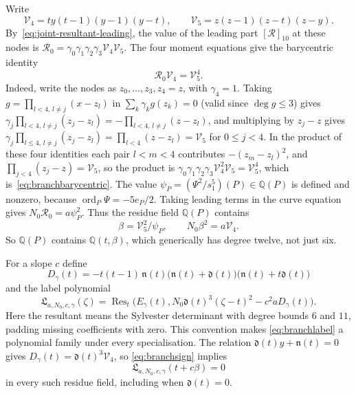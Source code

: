 \documentclass[11pt]{article}
\theoremstyle{definition}
\theoremstyle{remark}
\begin{document}
Write
\[
 \mathcal V_4=t y(t-1)(y-1)(y-t),\qquad \mathcal V_5=z(z-1)(z-t)(z-y).
\]
By~\eqref{eq:joint-resultant-leading}, the value of the leading part
$[\mathcal R]_{10}$ at these nodes is
$\mathcal R_0=\gamma_0\gamma_1\gamma_2\gamma_3\mathcal V_4\mathcal V_5$.
The four moment equations give the barycentric identity
\begin{equation}\label{eq:branchbarycentric}
 \mathcal R_0\mathcal V_4=\mathcal V_5^4.
\end{equation}
Indeed, write the nodes as $z_0,\dots,z_3,z_4=z$, with $\gamma_4=1$. Taking
$g=\prod_{l<4,\,l\ne j}(x-z_l)$ in $\sum_k\gamma_kg(z_k)=0$ (valid since $\deg g\le3$)
gives $\gamma_j\prod_{l<4,\,l\ne j}(z_j-z_l)=-\prod_{l<4,\,l\ne j}(z-z_l)$, and multiplying
by $z_j-z$ gives $\gamma_j\prod_{l\le4,\,l\ne j}(z_j-z_l)=\prod_{l<4}(z-z_l)=\mathcal V_5$ for
$0\le j<4$. In the product of these four identities each pair $l<m<4$ contributes
$-(z_m-z_l)^2$, and $\prod_{j<4}(z_j-z)=\mathcal V_5$, so the product is
$\gamma_0\gamma_1\gamma_2\gamma_3\mathcal V_4^2\mathcal V_5=\mathcal V_5^4$,
which is~\eqref{eq:branchbarycentric}.
The value
$\psi_P=(\Psi^2/s_1^5)(P)\in\mathbb Q(P)$ is defined and nonzero, because
$\operatorname{ord}_P\Psi=-5e_P/2$.
Taking leading terms in the curve equation gives
$N_0\mathcal R_0=a\psi_P^2$. Thus the residue field $\mathbb Q(P)$ contains
\begin{equation}\label{eq:branchsign}
 \beta=\mathcal V_5^2/\psi_P,\qquad N_0\beta^2=a\mathcal V_4.
\end{equation}
So $\mathbb Q(P)$ contains $\mathbb Q(t,\beta)$, which generically has degree
twelve, not just six.

For a slope $c$ define
\[
 D_\gamma(t)=-t(t-1)\,\mathfrak n(t)\bigl(\mathfrak n(t)+\mathfrak d(t)\bigr)\bigl(\mathfrak n(t)+t\mathfrak d(t)\bigr)
\]
and the label polynomial
\begin{equation}\label{eq:branchlabel}
 \mathfrak L_{a,N_0,c,\gamma}(\zeta)=
 \operatorname{Res}_t\bigl(E_\gamma(t),
       N_0\mathfrak d(t)^3(\zeta-t)^2-c^2aD_\gamma(t)\bigr).
\end{equation}
Here the resultant means the Sylvester determinant with degree bounds $6$
and $11$, padding missing coefficients with zero. This convention makes
\eqref{eq:branchlabel} a polynomial family under every specialisation.
The relation $\mathfrak d(t)y+\mathfrak n(t)=0$ gives $D_\gamma(t)=\mathfrak d(t)^3\mathcal V_4$, so
\eqref{eq:branchsign} implies
\[
 \mathfrak L_{a,N_0,c,\gamma}(t+c\beta)=0
\]
in every such residue field, including when $\mathfrak d(t)=0$.
\end{document}

